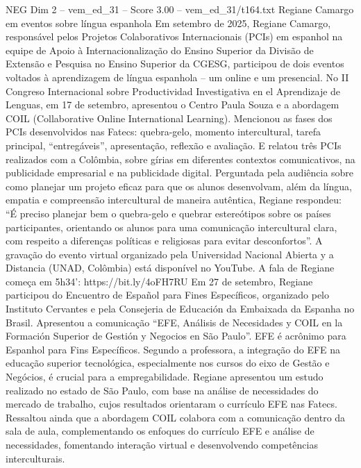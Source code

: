 \begin{textsample}{NEG Dim 2 – vem\_ed\_31 – Score 3.00 – vem\_ed\_31/t164.txt}  \label{ex:f2_neg_175}
Regiane Camargo em eventos sobre língua espanhola Em setembro de 2025, Regiane Camargo, responsável pelos Projetos Colaborativos Internacionais (PCIs) em espanhol na equipe de Apoio à Internacionalização do Ensino Superior da Divisão de Extensão e Pesquisa no Ensino Superior da CGESG, participou de dois eventos voltados à aprendizagem de língua espanhola – um online e um presencial.
No II Congreso Internacional sobre Productividad Investigativa en el Aprendizaje de Lenguas, em 17 de setembro, apresentou o Centro Paula Souza e a abordagem COIL (Collaborative Online International Learning).
Mencionou as fases dos PCIs desenvolvidos nas Fatecs: quebra-gelo, momento intercultural, tarefa principal, “entregáveis”, apresentação, reflexão e avaliação.
E relatou três PCIs realizados com a Colômbia, sobre gírias em diferentes contextos comunicativos, na publicidade empresarial e na publicidade digital.
Perguntada pela audiência sobre como planejar um projeto eficaz para que os alunos desenvolvam, além da língua, empatia e compreensão intercultural de maneira autêntica, Regiane respondeu: “É preciso planejar bem o quebra-gelo e quebrar estereótipos sobre os países participantes, orientando os alunos para uma comunicação intercultural clara, com respeito a diferenças políticas e religiosas para evitar desconfortos”.
A gravação do evento virtual organizado pela Universidad Nacional Abierta y a Distancia (UNAD, Colômbia) está disponível no YouTube.
A fala de Regiane começa em 5h34’: https://bit.ly/4oFH7RU Em 27 de setembro, Regiane participou do Encuentro de Español para Fines Específicos, organizado pelo Instituto Cervantes e pela Consejeria de Educación da Embaixada da Espanha no Brasil.
Apresentou a comunicação “EFE, Análisis de Necesidades y COIL en la Formación Superior de Gestión y Negocios en São Paulo”.
EFE é acrônimo para Espanhol para Fins Específicos.
Segundo a professora, a integração do EFE na educação superior tecnológica, especialmente nos cursos do eixo de Gestão e Negócios, é crucial para a empregabilidade.
Regiane apresentou um estudo realizado no estado de São Paulo, com base na análise de necessidades do mercado de trabalho, cujos resultados orientaram o currículo EFE nas Fatecs.
Ressaltou ainda que a abordagem COIL colabora com a comunicação dentro da sala de aula, complementando os enfoques do currículo EFE e análise de necessidades, fomentando interação virtual e desenvolvendo competências interculturais.

\end{textsample}
